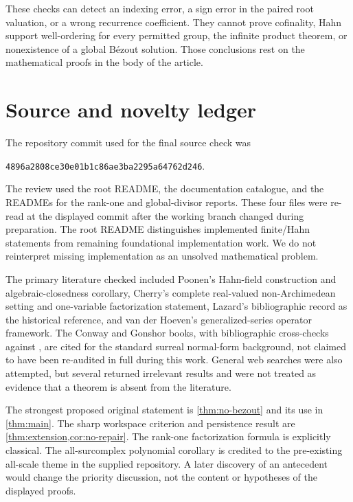 \documentclass[11pt]{article}
\theoremstyle{plain}
\theoremstyle{plain}
\theoremstyle{plain}
\theoremstyle{definition}
\theoremstyle{definition}
\theoremstyle{definition}
\theoremstyle{remark}
\newcommand{\reposha}{\texttt{4896a2808ce30e01b1c86ae3ba2295a64762d246}}
\begin{document}
These checks can detect an indexing error, a sign error in the paired
root valuation, or a wrong recurrence coefficient. They cannot prove
cofinality, Hahn support well-ordering for every permitted group,
the infinite product theorem, or nonexistence of a global B\'ezout
solution. Those conclusions rest on the mathematical proofs in the
body of the article.

\section{Source and novelty ledger}
\label{app:sources}

The repository commit used for the final source check was
\begin{center}\small\reposha.\end{center}
The review used the root README, the documentation catalogue, and
the READMEs for the rank-one and global-divisor reports. These four
files were re-read at the displayed commit after the working branch
changed during preparation. The root
README distinguishes implemented finite/Hahn statements from remaining
foundational implementation work. We do not reinterpret missing
implementation as an unsolved mathematical problem.

The primary literature checked included Poonen's Hahn-field
construction and algebraic-closedness corollary, Cherry's complete
real-valued non-Archimedean setting and one-variable factorization
statement, Lazard's bibliographic record as the historical reference,
and van der Hoeven's generalized-series operator framework. The
Conway and Gonshor books, with bibliographic cross-checks against
\cite{ADH}, are cited for the standard surreal normal-form
background, not claimed to have been re-audited in full during this
work. General web searches were also attempted, but several returned
irrelevant results and were not treated as evidence that a theorem
is absent from the literature.

The strongest proposed original statement is \cref{thm:no-bezout}
and its use in \cref{thm:main}. The sharp workspace criterion and
persistence result are \cref{thm:extension,cor:no-repair}.
The rank-one factorization formula is explicitly classical. The
all-surcomplex polynomial corollary is credited to the pre-existing
all-scale theme in the supplied repository. A later discovery of
an antecedent would change the priority discussion, not the content
or hypotheses of the displayed proofs.
\end{document}
